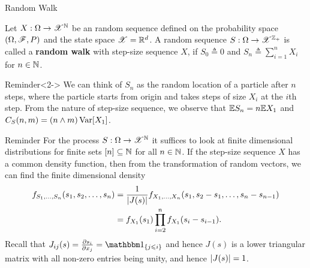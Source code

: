 \documentclass[12pt,aspectratio=169]{beamer}
\begin{document}
\begin{frame}{Random Walk}
\begin{Definition}
Let $X: \Omega \to \mathscr{X}^{\mathbb{N}}$ be an \iid random sequence defined on the probability space $(\Omega, \mathscr{F}, P)$ and the state space $\mathscr{X} = \mathbb{R}^d$. 
A random sequence $S: \Omega \to \mathscr{X}^{\mathbb{Z}_+}$ is called a \textbf{random walk} with step-size sequence $X$, 
if $S_0 \triangleq 0$ and $S_n \triangleq \sum_{i=1}^nX_i$ for $n \in \mathbb{N}$. 
\end{Definition}
\begin{block}{Reminder}<2->
We can think of $S_n$ as the random location of a particle after $n$ steps, 
where the particle starts from origin and takes steps of size $X_i$ at the $i$th step. 
From the \iid nature of step-size sequence, 
we observe that $\mathbb{E} S_n = n\mathbb{E} X_1$ and $C_S(n,m) = (n\wedge m)\operatorname{Var}[X_1]$.
\end{block}
\end{frame}


\begin{frame}
\begin{block}{Reminder} 
For the process $S: \Omega \to \mathscr{X}^{\mathbb{N}}$ it suffices to look at finite dimensional distributions for finite sets $[n] \subseteq \mathbb{N}$ for all $n \in \mathbb{N}$. 
If the \iid step-size sequence $X$ has a common density function, 
then from the transformation of random vectors, 
we can find the finite dimensional density 
\begin{align*}
f_{S_1, \dots, S_n}(s_1, s_2, \dots, s_n) 
&= \frac{1}{\left\lvert J(s)\right\rvert}f_{X_1, \dots, X_n}(s_1, s_2-s_1, \dots, s_n-s_{n-1}) \\
&= f_{X_1}(s_1)\prod_{i=2}^nf_{X_1}(s_i-s_{i-1}).
\end{align*}
Recall that $J_{ij}(s) = \frac{\partial s_i}{\partial x_j} = \SetIn{j \le i}$ and hence $J(s)$ is a lower triangular matrix with all non-zero entries being unity, and hence $\left\lvert J(s)\right\rvert = 1$.
\end{block}
\end{frame}
\end{document}

